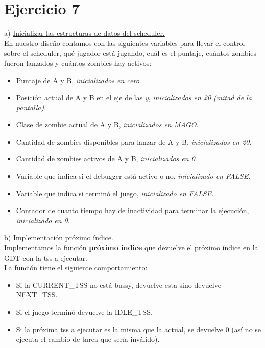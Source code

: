 \documentclass[a4paper]{article}
\begin{document}
\newpage
\section{Ejercicio 7}


{\large a)} \underline{Inicializar las estructuras de datos del scheduler.}\\

En nuestro dise\~no contamos con las siguientes variables para llevar el control sobre el scheduler, qu\'e jugador est\'a jugando, cu\'al es el puntaje, cu\'antos zombies fueron lanzados y cu\'antos zombies hay activos:

\begin{itemize}
\item Puntaje de A y B, \textit{inicializados en cero}.
\item Posici\'on actual de A y B en el eje de las \emph{y}, \textit{inicializados en 20 (mitad de la pantalla)}.
\item Clase de zombie actual de A y B, \textit{inicializados en MAGO}.
\item Cantidad de zombies disponibles para lanzar de A y B, \textit{inicializados en 20}.
\item Cantidad de zombies activos de A y B, \textit{inicializados en 0}.
\item Variable que indica si el debugger est\'a activo o no, \textit{inicializado en FALSE}.
\item Variable que indica si termin\'o el juego, \textit{inicializado en FALSE}.
\item Contador de cuanto tiempo hay de inactividad para terminar la ejecuci\'on, \textit{inicializado en 0}.
\end{itemize}



\bigskip

{\large b)} \underline{Implementaci\'on pr\'oximo \'indice.}\\

Implementamos la funci\'on \textbf{pr\'oximo \'indice} que devuelve el pr\'oximo \'indice en la GDT con la tss a ejecutar.\\

La funci\'on tiene el siguiente comportamiento:

\begin{itemize}
\item Si la CURRENT_TSS no est\'a bussy, devuelve esta sino devuelve NEXT_TSS.
\item Si el juego termin\'o devuelve la IDLE_TSS.
\item Si la pr\'oxima tss a ejecutar es la misma que la actual, se devuelve 0 (as\'i no se ejecuta el cambio de tarea que ser\'ia inv\'alido).
\end{itemize}
\end{document}
